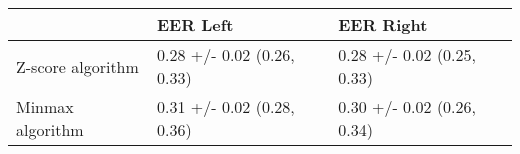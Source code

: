 \begin{tabular}{lll}
\toprule
{} &                    EER Left &                   EER Right \\
\midrule
Z-score algorithm &  0.28 +/- 0.02 (0.26, 0.33) &  0.28 +/- 0.02 (0.25, 0.33) \\
Minmax algorithm  &  0.31 +/- 0.02 (0.28, 0.36) &  0.30 +/- 0.02 (0.26, 0.34) \\
\bottomrule
\end{tabular}
